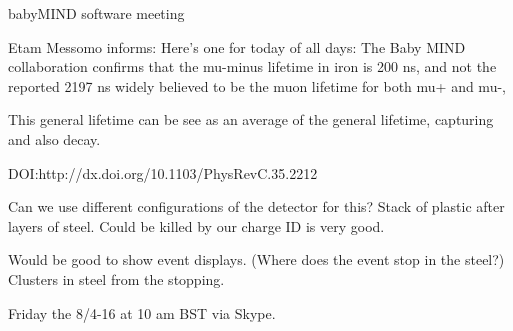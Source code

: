 \documentclass{article}
\begin{document}
\begin{Minutes}{babyMIND software meeting}

Etam Messomo informs: Here's one for today of all days: The Baby MIND collaboration confirms that the mu-minus lifetime in iron is 200 ns, and not the reported 2197 ns widely believed to be the muon lifetime for both mu+ and mu-, 

This general lifetime can be see as an average of the general lifetime, capturing and also decay.

DOI:http://dx.doi.org/10.1103/PhysRevC.35.2212

Can we use different configurations of the detector for this? Stack of plastic after layers of steel.
Could be killed by our charge ID is very good.

Would be good to show event displays. (Where does the event stop in the steel?) Clusters in steel from the stopping.

Friday the 8/4-16 at 10 am BST via Skype.

\end{Minutes}
\end{document}
